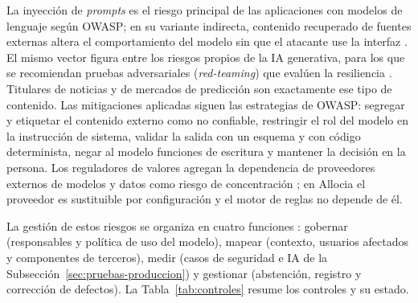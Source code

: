 La inyección de \textit{prompts} es el riesgo principal de las aplicaciones con modelos de lenguaje según OWASP; en su variante indirecta, contenido recuperado de fuentes externas altera el comportamiento del modelo sin que el atacante use la interfaz \parencite{OWASP2025llm,Greshake2023indirect}. El mismo vector figura entre los riesgos propios de la IA generativa, para los que se recomiendan pruebas adversariales (\textit{red-teaming}) que evalúen la resiliencia \parencite{NIST2024genai}. Titulares de noticias y de mercados de predicción son exactamente ese tipo de contenido. Las mitigaciones aplicadas siguen las estrategias de OWASP: segregar y etiquetar el contenido externo como no confiable, restringir el rol del modelo en la instrucción de sistema, validar la salida con un esquema y con código determinista, negar al modelo funciones de escritura y mantener la decisión en la persona. Los reguladores de valores agregan la dependencia de proveedores externos de modelos y datos como riesgo de concentración \parencite{IOSCO2025ai}; en Allocia el proveedor es sustituible por configuración y el motor de reglas no depende de él.

La gestión de estos riesgos se organiza en cuatro funciones \parencite{NIST2023airmf}: gobernar (responsables y política de uso del modelo), mapear (contexto, usuarios afectados y componentes de terceros), medir (casos de seguridad e IA de la Subsección~\ref{sec:pruebas-produccion}) y gestionar (abstención, registro y corrección de defectos). La Tabla~\ref{tab:controles} resume los controles y su estado.

